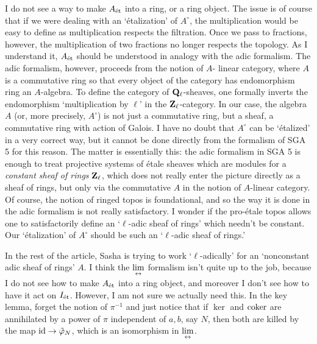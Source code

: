 \documentclass[deligne.tex]{subfiles}
\begin{document}
I do not see a way to make $A_{\text{\'et}}$ into a ring, or a ring object.
The issue is of course that if we were dealing with an `étalization' of 
$A^\circ$, the multiplication would be easy to define as multiplication
respects the filtration. Once we pass to fractions, however, the
multiplication of two fractions no longer respects the topology.
As I understand it, $A_{\text{\'et}}$ should be understood in analogy with the adic
formalism. The adic formalism, however, proceeds from the notion of $A$-
linear category, where $A$ is a commutative ring so that every object of the 
category has endomorphism ring an $A$-algebra. To define the category of
$\mathbf{Q}_\ell$-sheaves, one formally inverts the endomorphism `multiplication by
$\ell$' in the $\mathbf{Z}_\ell$-category. In our case, the algebra $A$ (or, more
precisely, $A^\circ$) is not just a commutative ring, but a sheaf, a 
commutative ring with action of Galois. I have no doubt that $A^\circ$ can
be `étalized' in a very correct way, but it cannot be done directly from
the formalism of SGA 5 for this reason. The matter is essentially this:
the adic formalism in SGA 5 is enough to treat projective systems of étale
sheaves which are modules for a \emph{constant sheaf of rings} $\mathbf{Z}_\ell$,
which does not really enter the picture directly as a sheaf of rings, but
only via the commutative $A$ in the notion of $A$-linear category.
Of course, the notion of ringed topos is foundational, and so the way it is
done in the adic formalism is not really satisfactory. I wonder if the
pro-étale topos allows one to satisfactorily define an `$\ell$-adic sheaf of
rings' which needn't be constant. Our `étalization' of $A^\circ$ should be
such an `$\ell$-adic sheaf of rings.'

In the rest of the article, Sasha is trying to work `$\ell$-adically' for
an `nonconstant adic sheaf of rings' $A$. I think the $\displaystyle\lim_{\leftrightarrow}$ formalism
isn't quite up to the job, because I do not see how to make $A_{\text{\'et}}$ into a
ring object, and moreover I don't see how to have it act on $I_{\text{\'et}}$. However,
I am not sure we actually need this. In the key lemma, forget the notion of
$\pi^{-1}$ and just notice that if $\ker$ and $\operatorname{coker}$ are annihilated by
a power of $\pi$ independent of $a,b$, say $N$, then both are killed by the
map $\operatorname{id}\rightarrow\tilde\varphi_N$, which is an isomorphism in $\displaystyle\lim_{\leftrightarrow}$.
\end{document}
